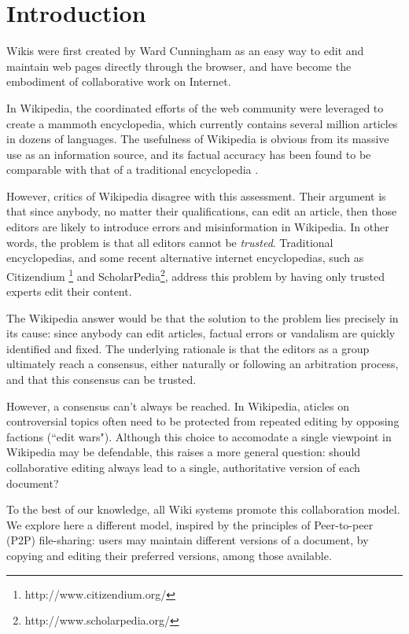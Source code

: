 \section{Introduction}
Wikis were first created by Ward Cunningham as an easy way to edit and maintain web pages directly through the browser, and have become the embodiment of collaborative work on Internet.

In Wikipedia, the coordinated efforts of the web community were leveraged to create a mammoth encyclopedia, which currently contains several million articles in dozens of languages. The usefulness of Wikipedia is obvious from its massive use as an information source, and its factual accuracy has been found to be comparable with that of a traditional encyclopedia \cite{NatureWikipedia}. 

However, critics of Wikipedia disagree with this assessment. Their argument is that since anybody, no matter their qualifications, can edit an article, then those editors are likely to introduce errors and misinformation in Wikipedia. In other words, the problem is that all editors cannot be \emph{trusted}. Traditional encyclopedias, and some recent alternative internet encyclopedias, such as Citizendium \footnote{http://www.citizendium.org/} and ScholarPedia\footnote{http://www.scholarpedia.org/}, address this problem by having only trusted experts edit their content.

The Wikipedia answer would be that the solution to the problem lies precisely in its cause: since anybody can edit articles, factual errors or vandalism are quickly identified and fixed. The underlying rationale is that the editors as a group ultimately reach a consensus, either naturally or following an arbitration process, and that this consensus can be trusted. 

However, a consensus can't always be reached. In Wikipedia, aticles on controversial topics often need to be protected from repeated editing by opposing factions (``edit wars"). Although this choice to accomodate a single viewpoint in Wikipedia may be defendable, this raises a more general question: should collaborative editing always lead to a single, authoritative version of each document? 

To the best of our knowledge, all Wiki systems promote this collaboration model. We explore here a different model, inspired by the principles of Peer-to-peer (P2P) file-sharing: users may maintain different versions of a document, by copying and editing their preferred versions, among those available. 

